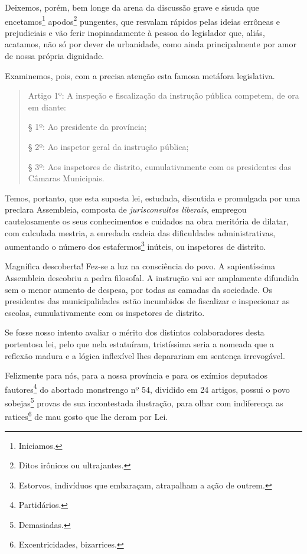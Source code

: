 Deixemos, porém, bem longe da arena da discussão grave e sisuda que
encetamos\footnote{Iniciamos.} apodos\footnote{Ditos irônicos ou
  ultrajantes.} pungentes, que resvalam rápidos pelas ideias errôneas e
prejudiciais e vão ferir inopinadamente à pessoa do legislador que,
aliás, acatamos, não só por dever de urbanidade, como ainda
principalmente por amor de nossa própria dignidade.

Examinemos, pois, com a precisa atenção esta famosa metáfora
legislativa.

\begin{quote}
Artigo 1º: A inspeção e fiscalização da instrução pública competem, de
ora em diante:

§ 1º: Ao presidente da província;

§ 2º: Ao inspetor geral da instrução pública;

§ 3º: Aos inspetores de distrito, cumulativamente com os presidentes das
Câmaras Municipais.
\end{quote}

Temos, portanto, que esta suposta lei, estudada, discutida e promulgada
por uma preclara Assembleia, composta de \emph{jurisconsultos liberais},
empregou cautelosamente os seus conhecimentos e cuidados na obra
meritória de dilatar, com calculada mestria, a enredada cadeia das
dificuldades administrativas, aumentando o número dos
estafermos\footnote{Estorvos, indivíduos que embaraçam, atrapalham a
  ação de outrem.} inúteis, ou inspetores de distrito.

Magnífica descoberta! Fez-se a luz na consciência do povo. A
sapientíssima Assembleia descobriu a pedra filosofal. A instrução vai
ser amplamente difundida sem o menor aumento de despesa, por todas as
camadas da sociedade. Os presidentes das municipalidades estão
incumbidos de fiscalizar e inspecionar as escolas, cumulativamente com
os inspetores de distrito.

Se fosse nosso intento avaliar o mérito dos distintos colaboradores
desta portentosa lei, pelo que nela estatuíram, tristíssima seria a
nomeada que a reflexão madura e a lógica inflexível lhes deparariam em
sentença irrevogável.

Felizmente para nós, para a nossa província e para os exímios deputados
fautores\footnote{Partidários.} do abortado monstrengo nº 54, dividido
em 24 artigos, possui o povo sobejas\footnote{Demasiadas.} provas de
sua incontestada ilustração, para olhar com indiferença as
ratices\footnote{Excentricidades, bizarrices.} de mau gosto que lhe
deram por Lei.


